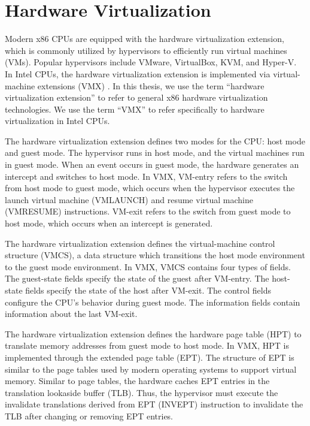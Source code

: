 \section{Hardware Virtualization}
\label{sec:bg_hvm}

Modern x86 CPUs are equipped with the hardware virtualization extension, which is commonly utilized by hypervisors to efficiently run virtual machines (VMs). Popular hypervisors include VMware, VirtualBox, KVM, and Hyper-V. In Intel CPUs, the hardware virtualization extension is implemented via virtual-machine extensions (VMX) \cite{intel_sdm}. In this thesis, we use the term ``hardware virtualization extension'' to refer to general x86 hardware virtualization technologies. We use the term ``VMX'' to refer specifically to hardware virtualization in Intel CPUs.

The hardware virtualization extension defines two modes for the CPU: host mode and guest mode. The hypervisor runs in host mode, and the virtual machines run in guest mode. When an event occurs in guest mode, the hardware generates an intercept and switches to host mode. In VMX, VM-entry refers to the switch from host mode to guest mode, which occurs when the hypervisor executes the launch virtual machine (VMLAUNCH) and resume virtual machine (VMRESUME) instructions. VM-exit refers to the switch from guest mode to host mode, which occurs when an intercept is generated.

The hardware virtualization extension defines the virtual-machine control structure (VMCS), a data structure which transitions the host mode environment to the guest mode environment. In VMX, VMCS contains four types of fields. The guest-state fields specify the state of the guest after VM-entry. The host-state fields specify the state of the host after VM-exit. The control fields configure the CPU's behavior during guest mode. The information fields contain information about the last VM-exit.

The hardware virtualization extension defines the hardware page table (HPT) to translate memory addresses from guest mode to host mode. In VMX, HPT is implemented through the extended page table (EPT). The structure of EPT is similar to the page tables used by modern operating systems to support virtual memory. Similar to page tables, the hardware caches EPT entries in the translation lookaside buffer (TLB). Thus, the hypervisor must execute the invalidate translations derived from EPT (INVEPT) instruction to invalidate the TLB after changing or removing EPT entries.

